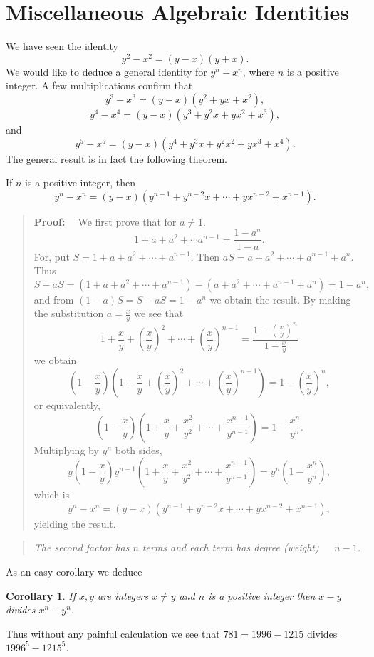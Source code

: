 \documentclass[11pt, openany]{book}
\theoremstyle{change} \theoremheaderfont{\blue\sffamily\bfseries}
\newtheorem{cor}[thm]{Corollary}
\newcommand{\proofsymbol}{\Pisymbol{pzd}{113}}
\theoremstyle{nonumberplain} \theoremheaderfont{\sffamily\bfseries}
\newenvironment{pf}[0]{\itshape\begin{quote}{\bf Proof: \ }}{\proofsymbol\end{quote}}
\newenvironment{rem}[0]{\begin{quote}{\huge\textcolor{red}{\Pisymbol{pzd}{43}}}\itshape }{\end{quote}}
\newcommand{\í}{\'{\i}}
\begin{document}
\section{Miscellaneous Algebraic Identities} We have seen the identity
\begin{equation}y^2-x^2 = (y-x)(y+x).
\label{eq:diff_of_squares}\end{equation} We would like to deduce a
general identity for $y^n-x^n$, where $n$ is a positive integer. A
few multiplications confirm that
\begin{equation}\label{eq:diff_of_cubes}y^3-x^3 = (y-x)(y^2 + yx +
x^2),
\end{equation}
\begin{equation}\label{eq:diff_of_fourths}y^4-x^4 = (y-x)(y^3 + y^2x + yx^2 + x^3),  \end{equation} and
\begin{equation}\label{eq:diff_of_fifths}y^5-x^5 = (y-x)(y^4 + y^3x + y^2x^2 + yx^3 + x^4).  \end{equation} The general
result is in fact the following theorem.
\begin{thm}\label{thm:binom_difference}If $n$ is a positive integer, then
$$y^n - x^n = (y-x)(y^{n-1} + y^{n-2}x + \cdots + yx^{n-2} + x^{n-1}).   $$
\end{thm}
\begin{pf} We first prove that for $a\neq 1$.
$$1 + a + a^2 + \cdots a^{n-1} = \dfrac{1 - a^{n}}{1 -a}.   $$For,
put $S = 1 + a + a^2 + \cdots + a^{n-1}.$ Then $aS = a + a^2 +
\cdots + a^{n-1} + a^n.$ Thus $S - aS = (1 + a + a^2 + \cdots
+a^{n-1}) - (a + a^2 + \cdots + a^{n-1} + a^n) = 1 - a^n,$ and from
$(1-a)S = S-aS=1 - a^n $ we obtain the result. By making the
substitution $a = \frac{x}{y}$ we see that
$$1 + \frac{x}{y} + \left(\frac{x}{y}\right)^2 + \cdots +
\left(\frac{x}{y}\right)^{n-1} = \dfrac{1-
\left(\frac{x}{y}\right)^n}{1-\frac{x}{y}}   $$ we obtain
$$\left(1-\frac{x}{y}\right)\left(1 + \frac{x}{y} +
\left(\frac{x}{y}\right)^2 + \cdots +
\left(\frac{x}{y}\right)^{n-1}\right) = 1-
\left(\frac{x}{y}\right)^n,   $$ or equivalently,
$$\left(1-\frac{x}{y}\right)\left(1 + \frac{x}{y} +
\frac{x^2}{y^2} + \cdots +\frac{x^{n-1}}{y^{n-1}}\right) = 1-
\frac{x^n}{y^n}.   $$ Multiplying by $y^n$ both sides,
$$y\left(1-\frac{x}{y}\right) y^{n-1}\left(1 + \frac{x}{y} +
\frac{x^2}{y^2} + \cdots +\frac{x^{n-1}}{y^{n-1}}\right) =
y^n\left(1- \frac{x^n}{y^n}\right),   $$ which is
$$y^n - x^n = (y-x)(y^{n-1} + y^{n-2}x + \cdots + yx^{n-2} + x^{n-1}),   $$
yielding the result.
\end{pf}
\begin{rem}
The second factor has $n$ terms and each term has degree (weight)\ \
\
 $n-1$.
\end{rem}
As an easy corollary we deduce
\begin{cor}
If $x, y$ are integers $x \neq y$ and $n$ is a positive integer
then $x - y$ divides $x^n - y^n.$
\end{cor}
Thus without any painful calculation we see that $781 = 1996 -
1215$ divides $1996^5 - 1215^5.$
\end{document}
